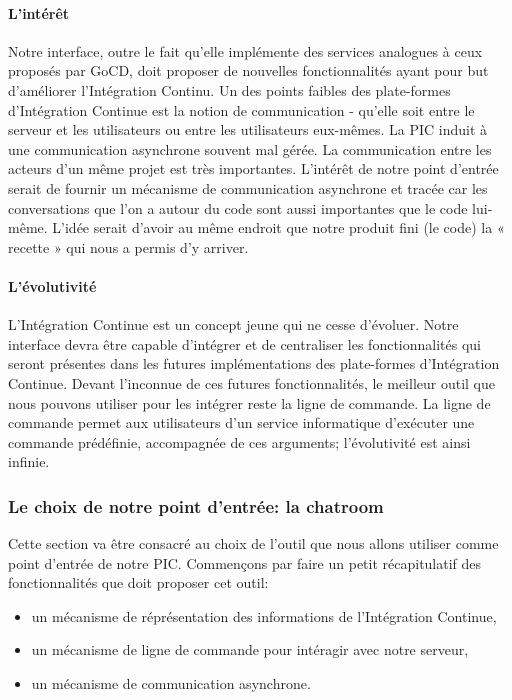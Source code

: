           \paragraph{L'intérêt} Notre interface, outre le fait qu'elle implémente des services analogues à ceux proposés par GoCD, doit proposer de nouvelles fonctionnalités ayant pour but d'améliorer l'Intégration Continu.
          Un des points faibles des plate-formes d'Intégration Continue est la notion de communication - qu'elle soit entre le serveur et les utilisateurs ou entre les utilisateurs eux-mêmes. La PIC induit à une communication asynchrone souvent mal gérée. La communication entre les acteurs d'un même projet est très importantes. L'intérêt de notre point d'entrée serait de fournir un mécanisme de communication asynchrone et tracée car les conversations que l'on a autour du code sont aussi importantes que le code lui-même. L'idée serait d'avoir au même endroit que notre produit fini (le code) la « recette » qui nous a permis d'y arriver.

          \paragraph{L'évolutivité} L'Intégration Continue est un concept jeune qui ne cesse d'évoluer. Notre interface devra être capable d'intégrer et de centraliser les fonctionnalités qui seront présentes dans les futures implémentations des plate-formes d'Intégration Continue.
          Devant l'inconnue de ces futures fonctionnalités, le meilleur outil que nous pouvons utiliser pour les intégrer reste la ligne de commande. La ligne de commande permet aux utilisateurs d'un service informatique d'exécuter une commande prédéfinie, accompagnée de ces arguments; l'évolutivité est ainsi infinie.

        \subsubsection{Le choix de notre point d'entrée: la chatroom}
        Cette section va être consacré au choix de l'outil que nous allons utiliser comme point d'entrée de notre PIC. Commençons par faire un petit récapitulatif des fonctionnalités que doit proposer cet outil:\\

        \begin{itemize}
          \item un mécanisme de réprésentation des informations de l'Intégration Continue,
          \item un mécanisme de ligne de commande pour intéragir avec notre serveur,
          \item un mécanisme de communication asynchrone.\\
        \end{itemize}

